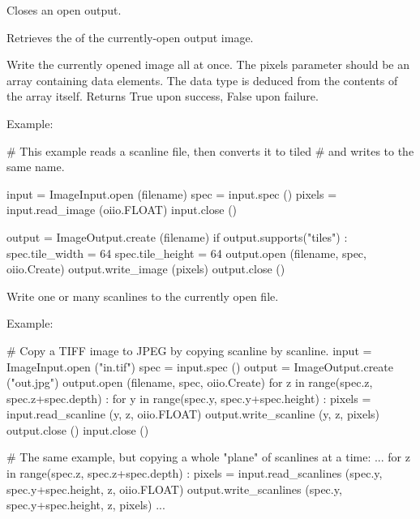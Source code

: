 Closes an open output.
\apiend

Retrieves the \ImageSpec of the currently-open output image.
\apiend

Write the currently opened image all at once.  The {\cf pixels} parameter
should be an {\cf array} containing data elements. The data type is
deduced from the contents of the array itself.
Returns {\cf True} upon success, {\cf False} upon failure.

\noindent Example:
\begin{code}
    # This example reads a scanline file, then converts it to tiled
    # and writes to the same name.

    input = ImageInput.open (filename)
    spec = input.spec ()
    pixels = input.read_image (oiio.FLOAT)
    input.close ()

    output = ImageOutput.create (filename)
    if output.supports("tiles") :
        spec.tile_width = 64
        spec.tile_height = 64
        output.open (filename, spec, oiio.Create)
        output.write_image (pixels)
        output.close ()
\end{code}
\apiend


Write one or many scanlines to the currently open file.

\noindent Example:
\begin{code}
    # Copy a TIFF image to JPEG by copying scanline by scanline.
    input = ImageInput.open ("in.tif")
    spec = input.spec ()
    output = ImageOutput.create ("out.jpg")
    output.open (filename, spec, oiio.Create)
    for z in range(spec.z, spec.z+spec.depth) :
        for y in range(spec.y, spec.y+spec.height) :
            pixels = input.read_scanline (y, z, oiio.FLOAT)
            output.write_scanline (y, z, pixels)
    output.close ()
    input.close ()

    # The same example, but copying a whole "plane" of scanlines at a time:
    ...
    for z in range(spec.z, spec.z+spec.depth) :
        pixels = input.read_scanlines (spec.y, spec.y+spec.height,
                                       z, oiio.FLOAT)
        output.write_scanlines (spec.y, spec.y+spec.height, z, pixels)
    ...
\end{code}
\apiend

